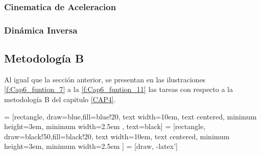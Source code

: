        \newpage
        \subsubsection{Cinematica de Aceleracion}



        \newpage
        \subsubsection{Dinámica Inversa}
        
        
        
        
        
        
        
        
        
        
        
        
        
        
        
        
        
        
        
        
        \newpage

        
    \subsection{Metodología B}
    
       Al igual que la sección anterior, se presentan en las ilustraciones \ref{f:Cap6_funtion_7} a la \ref{f:Cap6_funtion_11} las tareas con respecto a la  metodología B del capitulo \ref{CAP4}. 
    
            \hspace{1cm}


     = [rectangle, draw=blue,fill=blue!20, text width=10em, text centered, minimum height=3em, minimum width=2.5em , text=black]
     = [rectangle, draw=black!50,fill=black!20, text width=10em, text centered, minimum height=3em, minimum width=2.5em ]
     = [draw, -latex']

